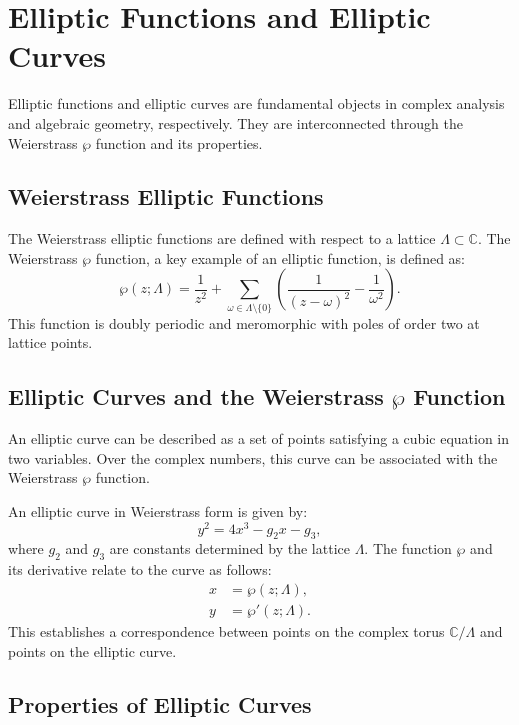 \section*{Elliptic Functions and Elliptic Curves}

Elliptic functions and elliptic curves are fundamental objects in complex analysis and algebraic geometry, respectively. They are interconnected through the Weierstrass $\wp$ function and its properties.

\subsection*{Weierstrass Elliptic Functions}

The Weierstrass elliptic functions are defined with respect to a lattice $\Lambda \subset \mathbb{C}$. The Weierstrass $\wp$ function, a key example of an elliptic function, is defined as:
\begin{equation}
	\wp(z; \Lambda) = \frac{1}{z^2} + \sum_{\omega \in \Lambda \setminus \{0\}} \left( \frac{1}{(z - \omega)^2} - \frac{1}{\omega^2} \right).
\end{equation}
This function is doubly periodic and meromorphic with poles of order two at lattice points.

\subsection*{Elliptic Curves and the Weierstrass $\wp$ Function}

An elliptic curve can be described as a set of points satisfying a cubic equation in two variables. Over the complex numbers, this curve can be associated with the Weierstrass $\wp$ function.

An elliptic curve in Weierstrass form is given by:
\begin{equation}
	y^2 = 4x^3 - g_2x - g_3,
\end{equation}
where $g_2$ and $g_3$ are constants determined by the lattice $\Lambda$. The function $\wp$ and its derivative relate to the curve as follows:
\begin{align}
	x &= \wp(z; \Lambda), \\
	y &= \wp'(z; \Lambda).
\end{align}
This establishes a correspondence between points on the complex torus $\mathbb{C}/\Lambda$ and points on the elliptic curve.

\subsection*{Properties of Elliptic Curves}

